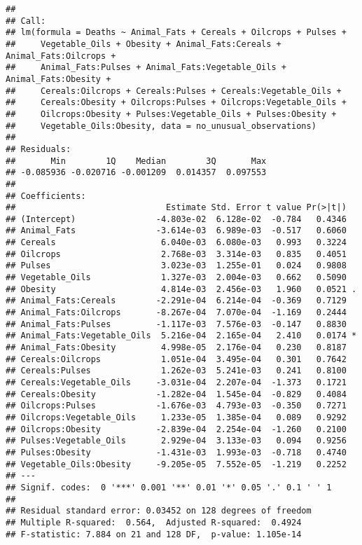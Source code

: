 \documentclass[
]{article}
\begin{document}
\begin{verbatim}
## 
## Call:
## lm(formula = Deaths ~ Animal_Fats + Cereals + Oilcrops + Pulses + 
##     Vegetable_Oils + Obesity + Animal_Fats:Cereals + Animal_Fats:Oilcrops + 
##     Animal_Fats:Pulses + Animal_Fats:Vegetable_Oils + Animal_Fats:Obesity + 
##     Cereals:Oilcrops + Cereals:Pulses + Cereals:Vegetable_Oils + 
##     Cereals:Obesity + Oilcrops:Pulses + Oilcrops:Vegetable_Oils + 
##     Oilcrops:Obesity + Pulses:Vegetable_Oils + Pulses:Obesity + 
##     Vegetable_Oils:Obesity, data = no_unusual_observations)
## 
## Residuals:
##       Min        1Q    Median        3Q       Max 
## -0.085936 -0.020716 -0.001209  0.014357  0.097553 
## 
## Coefficients:
##                              Estimate Std. Error t value Pr(>|t|)  
## (Intercept)                -4.803e-02  6.128e-02  -0.784   0.4346  
## Animal_Fats                -3.614e-03  6.989e-03  -0.517   0.6060  
## Cereals                     6.040e-03  6.080e-03   0.993   0.3224  
## Oilcrops                    2.768e-03  3.314e-03   0.835   0.4051  
## Pulses                      3.023e-03  1.255e-01   0.024   0.9808  
## Vegetable_Oils              1.327e-03  2.004e-03   0.662   0.5090  
## Obesity                     4.814e-03  2.456e-03   1.960   0.0521 .
## Animal_Fats:Cereals        -2.291e-04  6.214e-04  -0.369   0.7129  
## Animal_Fats:Oilcrops       -8.267e-04  7.070e-04  -1.169   0.2444  
## Animal_Fats:Pulses         -1.117e-03  7.576e-03  -0.147   0.8830  
## Animal_Fats:Vegetable_Oils  5.216e-04  2.165e-04   2.410   0.0174 *
## Animal_Fats:Obesity         4.998e-05  2.176e-04   0.230   0.8187  
## Cereals:Oilcrops            1.051e-04  3.495e-04   0.301   0.7642  
## Cereals:Pulses              1.262e-03  5.241e-03   0.241   0.8100  
## Cereals:Vegetable_Oils     -3.031e-04  2.207e-04  -1.373   0.1721  
## Cereals:Obesity            -1.282e-04  1.545e-04  -0.829   0.4084  
## Oilcrops:Pulses            -1.676e-03  4.793e-03  -0.350   0.7271  
## Oilcrops:Vegetable_Oils     1.233e-05  1.385e-04   0.089   0.9292  
## Oilcrops:Obesity           -2.839e-04  2.254e-04  -1.260   0.2100  
## Pulses:Vegetable_Oils       2.929e-04  3.133e-03   0.094   0.9256  
## Pulses:Obesity             -1.431e-03  1.993e-03  -0.718   0.4740  
## Vegetable_Oils:Obesity     -9.205e-05  7.552e-05  -1.219   0.2252  
## ---
## Signif. codes:  0 '***' 0.001 '**' 0.01 '*' 0.05 '.' 0.1 ' ' 1
## 
## Residual standard error: 0.03452 on 128 degrees of freedom
## Multiple R-squared:  0.564,  Adjusted R-squared:  0.4924 
## F-statistic: 7.884 on 21 and 128 DF,  p-value: 1.105e-14
\end{verbatim}
\end{document}
